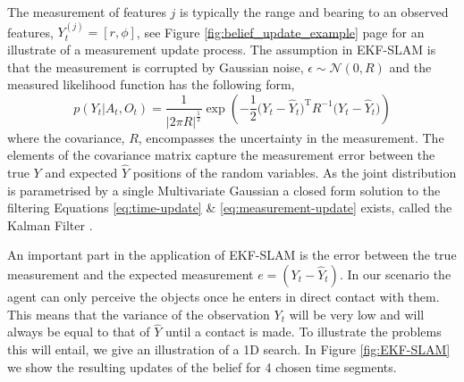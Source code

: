 The measurement of features $j$ is typically the range and bearing to an observed features, $Y^{(j)}_t = [r,\phi]$,
see Figure \ref{fig:belief_update_example} page \pageref{fig:belief_update_example} for an illustrate of a measurement update process.
The assumption in EKF-SLAM is that the measurement is corrupted by Gaussian noise, $\epsilon \sim \mathcal{N}(0,R)$
and the measured likelihood function has the following form,
\begin{equation} \label{eq:lik-measurement}
   p(Y_t|A_t,O_t) = \frac{1}{|2\pi R|^{\frac{1}{2}}} \exp \left( -\frac{1}{2} \big(Y_t - \hat{Y}_t\big)^{\mathrm{T}}R^{-1}\big(Y_t - \hat{Y}_t\big) \right)
\end{equation}
where the covariance, $R$, encompasses the uncertainty in the measurement. The elements of the covariance matrix capture 
the measurement error between the true $Y$ and expected $\hat{Y}$ positions of the random variables. As the joint distribution 
is parametrised by a single Multivariate Gaussian a closed form solution to the filtering Equations \ref{eq:time-update} \& \ref{eq:measurement-update} 
exists, called the Kalman Filter \cite{SLAM_part1}. 

An important part in the application of EKF-SLAM is the error between the true measurement and the expected measurement 
$e = (Y_t - \hat{Y}_t)$. In our scenario the agent can only perceive the objects once he enters in direct contact with them. 
This means that the variance of the observation $Y_t$ will be very low and will always be equal to that of $\hat{Y}$ until a contact is made. 
To illustrate the problems this will entail, we give an illustration of a 1D search. In Figure \ref{fig:EKF-SLAM} we show the resulting updates of the belief 
for 4 chosen time segments.

